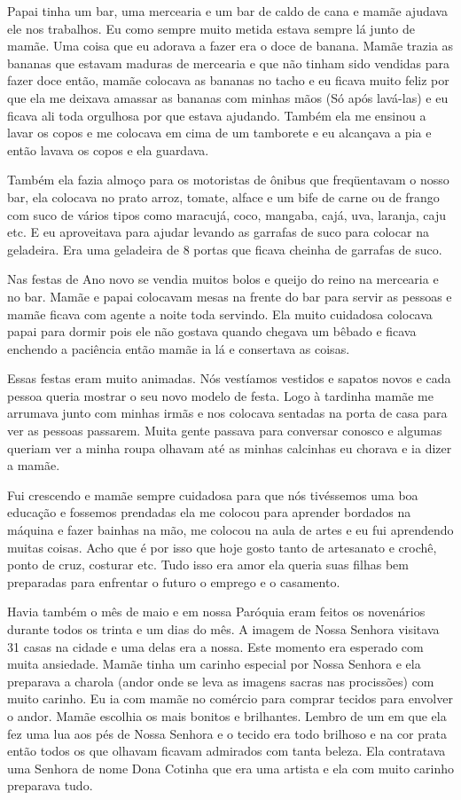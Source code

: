 \documentclass[
  brazil,
  a6paper,
  oneside,
  landscape,
  14pt]{scrbook}
\begin{document}
Papai tinha um bar, uma mercearia e um bar de caldo de cana e mamãe
ajudava ele nos trabalhos. Eu como sempre muito metida estava sempre lá
junto de mamãe. Uma coisa que eu adorava a fazer era o doce de banana.
Mamãe trazia as bananas que estavam maduras de mercearia e que não
tinham sido vendidas para fazer doce então, mamãe colocava as bananas no
tacho e eu ficava muito feliz por que ela me deixava amassar as bananas
com minhas mãos (Só após lavá-las) e eu ficava ali toda orgulhosa por
que estava ajudando. Também ela me ensinou a lavar os copos e me
colocava em cima de um tamborete e eu alcançava a pia e então lavava os
copos e ela guardava.

Também ela fazia almoço para os motoristas de ônibus que freqüentavam o
nosso bar, ela colocava no prato arroz, tomate, alface e um bife de
carne ou de frango com suco de vários tipos como maracujá, coco,
mangaba, cajá, uva, laranja, caju etc. E eu aproveitava para ajudar
levando as garrafas de suco para colocar na geladeira. Era uma geladeira
de 8 portas que ficava cheinha de garrafas de suco.

Nas festas de Ano novo se vendia muitos bolos e queijo do reino na
mercearia e no bar. Mamãe e papai colocavam mesas na frente do bar para
servir as pessoas e mamãe ficava com agente a noite toda servindo. Ela
muito cuidadosa colocava papai para dormir pois ele não gostava quando
chegava um bêbado e ficava enchendo a paciência então mamãe ia lá e
consertava as coisas.

Essas festas eram muito animadas. Nós vestíamos vestidos e sapatos novos
e cada pessoa queria mostrar o seu novo modelo de festa. Logo à tardinha
mamãe me arrumava junto com minhas irmãs e nos colocava sentadas na
porta de casa para ver as pessoas passarem. Muita gente passava para
conversar conosco e algumas queriam ver a minha roupa olhavam até as
minhas calcinhas eu chorava e ia dizer a mamãe.

Fui crescendo e mamãe sempre cuidadosa para que nós tivéssemos uma boa
educação e fossemos prendadas ela me colocou para aprender bordados na
máquina e fazer bainhas na mão, me colocou na aula de artes e eu fui
aprendendo muitas coisas. Acho que é por isso que hoje gosto tanto de
artesanato e crochê, ponto de cruz, costurar etc. Tudo isso era amor ela
queria suas filhas bem preparadas para enfrentar o futuro o emprego e o
casamento.

Havia também o mês de maio e em nossa Paróquia eram feitos os novenários
durante todos os trinta e um dias do mês. A imagem de Nossa Senhora
visitava 31 casas na cidade e uma delas era a nossa. Este momento era
esperado com muita ansiedade. Mamãe tinha um carinho especial por Nossa
Senhora e ela preparava a charola (andor onde se leva as imagens sacras
nas procissões) com muito carinho. Eu ia com mamãe no comércio para
comprar tecidos para envolver o andor. Mamãe escolhia os mais bonitos e
brilhantes. Lembro de um em que ela fez uma lua aos pés de Nossa Senhora
e o tecido era todo brilhoso e na cor prata então todos os que olhavam
ficavam admirados com tanta beleza. Ela contratava uma Senhora de nome
Dona Cotinha que era uma artista e ela com muito carinho preparava tudo.
\end{document}
